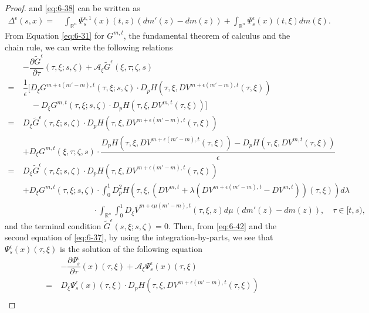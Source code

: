 \documentclass[11pt]{article}
\numberwithin{equation}{section}
\newcommand{\brn}{{\mathbb{R}^n}}
\newcommand{\de}{\Delta}
\newcommand{\1}{\mbox{1\hspace{-1mm}I}}
\begin{document}
\begin{proof}
and \eqref{eq:6-38} can be written as
\begin{align}
    \de^{\epsilon}(s,x)=\ & \int_{\brn}\Psi_{s}^{\epsilon,1}(x)(t,z)\left(dm'(z)-dm(z)\right)+\int_{\brn} \Psi_{s}^{\epsilon}(x)(t,\xi) dm(\xi). \label{eq:6-38'}
\end{align}
From Equation \ref{eq:6-31} for $G^{m,t}$, the fundamental theorem of calculus and the chain rule, we can write the following relations 
\begin{align*}
    &-\dfrac{\partial \widetilde{G}^{\epsilon}}{\partial\tau}(\tau,\xi;s,\zeta)+\mathcal{A}_{\xi}\widetilde{G}^{\epsilon}(\xi,\tau;\zeta,s)\\
    =\ & \dfrac{1}{\epsilon}\bigg[D_{\xi}G^{m+\epsilon(m'-m),t}(\tau,\xi;s,\zeta)\cdot D_p H\left(\tau,\xi,DV^{m+\epsilon(m'-m),t}(\tau,\xi)\right)\\
    &\quad -D_{\xi}G^{m,t}(\tau,\xi;s,\zeta)\cdot D_pH \left(\tau,\xi,DV^{m,t}(\tau,\xi)\right)\bigg]\\
    =\ & D_{\xi}\widetilde{G}^{\epsilon}(\tau,\xi;s,\zeta)\cdot D_pH \left(\tau,\xi,DV^{m+\epsilon(m'-m),t}(\tau,\xi)\right)\\
    &+D_{\xi}G^{m,t}(\xi,\tau;\zeta,s)\cdot \dfrac{D_p H \left(\tau,\xi,DV^{m+\epsilon(m'-m),t}(\tau,\xi)\right)-D_p H \left(\tau,\xi,DV^{m,t}(\tau,\xi)\right)}{\epsilon}\\
    =\ & D_{\xi}\widetilde{G}^{\epsilon}(\tau,\xi;s,\zeta)\cdot D_pH \left(\tau,\xi,DV^{m+\epsilon(m'-m),t}(\tau,\xi)\right)\\
    &+D_{\xi}G^{m,t}(\tau,\xi;s,\zeta)\cdot \int_{0}^{1}D_{p}^{2}H\left(\tau,\xi,\left(DV^{m,t}+\lambda(DV^{m+\epsilon(m'-m),t}-DV^{m,t})\right)(\tau,\xi) \right)d\lambda\\
    &\;\;\qquad\qquad\qquad\qquad \cdot \int_{\brn}\int_{0}^{1}D_\xi\overline{V}^{m+\epsilon\mu(m'-m),t}(\tau,\xi,z)d\mu\,(dm'(z)-dm(z)),\quad \tau\in[t,s),
\end{align*}
and the terminal condition $\widetilde{G}^{\epsilon}(s,\xi;s,\zeta)=0$. Then, from \eqref{eq:6-42} and the second equation of \eqref{eq:6-37}, by using the integration-by-parts, we see that $\Psi_{s}^{\epsilon}(x)(\tau,\xi)$ is the solution of the following equation
\begin{align*}
    &-\dfrac{\partial \Psi_{s}^{\epsilon}}{\partial\tau}(x)(\tau,\xi)+\mathcal{A}_{\xi}\Psi_{s}^{\epsilon}(x)(\tau,\xi)\\
    =\ & D_{\xi}\Psi_{s}^{\epsilon}(x)(\tau,\xi)\cdot D_p H \left(\tau,\xi,DV^{m+\epsilon(m'-m),t}(\tau,\xi) \right)\\

\end{align*}
\end{proof}
\end{document}
